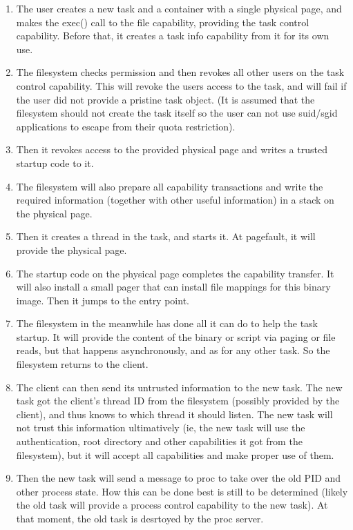 \documentclass[9pt,a4paper]{extarticle}
\begin{document}
\begin{enumerate}
\item The user creates a new task and a container with a single
  physical page, and makes the exec() call to the file capability,
  providing the task control capability.  Before that, it creates a
  task info capability from it for its own use.
\item The filesystem checks permission and then revokes all other
  users on the task control capability.  This will revoke the users
  access to the task, and will fail if the user did not provide a
  pristine task object.  (It is assumed that the filesystem should not
  create the task itself so the user can not use suid/sgid
  applications to escape from their quota restriction).
\item Then it revokes access to the provided physical page and writes
  a trusted startup code to it.
\item The filesystem will also prepare all capability transactions and
  write the required information (together with other useful
  information) in a stack on the physical page.
\item Then it creates a thread in the task, and starts it.  At
  pagefault, it will provide the physical page.
\item The startup code on the physical page completes the capability
  transfer.  It will also install a small pager that can install file
  mappings for this binary image.  Then it jumps to the entry point.
\item The filesystem in the meanwhile has done all it can do to help
  the task startup.  It will provide the content of the binary or
  script via paging or file reads, but that happens asynchronously,
  and as for any other task.  So the filesystem returns to the client.
\item The client can then send its untrusted information to the new
  task.  The new task got the client's thread ID from the filesystem
  (possibly provided by the client), and thus knows to which thread it
  should listen.  The new task will not trust this information
  ultimatively (ie, the new task will use the authentication, root
  directory and other capabilities it got from the filesystem), but it
  will accept all capabilities and make proper use of them.
\item Then the new task will send a message to proc to take over the
  old PID and other process state.  How this can be done best is still
  to be determined (likely the old task will provide a process control
  capability to the new task).  At that moment, the old task is
  desrtoyed by the proc server.
\end{enumerate}
\end{document}

